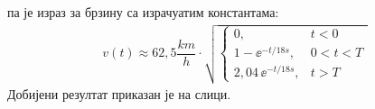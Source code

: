     па је израз за брзину са израчуатим константама: 
    \begin{eqnarray}
        v(t) \approx 62,5 \unit{\dfrac{km}{h}} \cdot 
        \sqrt{
        \begin{cases}
            0 , & t < 0 \\
            1 - \ee^{-t/18\unit{s}} , & 0 < t < T \\
            2,04\, \ee^{-t/18\unit{s}} , & t > T 
        \end{cases}
        }
    \end{eqnarray} 
    Добијени резултат приказан је на слици.




    

